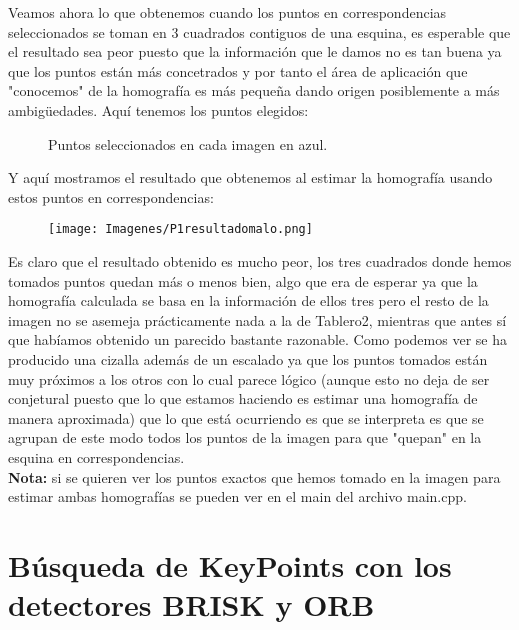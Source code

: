\documentclass[10pt,a4paper]{article}
\begin{document}
Veamos ahora lo que obtenemos cuando los puntos en correspondencias seleccionados se toman en 3 cuadrados contiguos de una esquina, es esperable que el resultado sea peor puesto que la información que le damos no es tan buena ya que los puntos están más concetrados y por tanto el área de aplicación que "conocemos" de la homografía es más pequeña dando origen posiblemente a más ambigüedades. Aquí tenemos los puntos elegidos:\\

\begin{figure}[H]
\centering
{}
\caption{Puntos seleccionados en cada imagen en azul.}
\end{figure}

Y aquí mostramos el resultado que obtenemos al estimar la homografía usando estos puntos en correspondencias:\\

\begin{figure}[H]
\centering
\texttt{[image: Imagenes/P1resultadomalo.png]}
\end{figure}

Es claro que el resultado obtenido es mucho peor, los tres cuadrados donde hemos tomados puntos quedan más o menos bien, algo que era de esperar ya que la homografía calculada se basa en la información de ellos tres pero el resto de la imagen no se asemeja prácticamente nada a la de Tablero2, mientras que antes sí que habíamos obtenido un parecido bastante razonable. Como podemos ver se ha producido una cizalla además de un escalado ya que los puntos tomados están muy próximos a los otros con lo cual parece lógico (aunque esto no deja de ser conjetural puesto que lo que estamos haciendo es estimar una homografía de manera aproximada) que lo que está ocurriendo es que se interpreta es que se agrupan de este modo todos los puntos de la imagen para que "quepan" en la esquina en correspondencias.\\

\textbf{Nota:} si se quieren ver los puntos exactos que hemos tomado en la imagen para estimar ambas homografías se pueden ver en el main del archivo main.cpp.
\section{Búsqueda de KeyPoints con los detectores BRISK y ORB}
\end{document}
